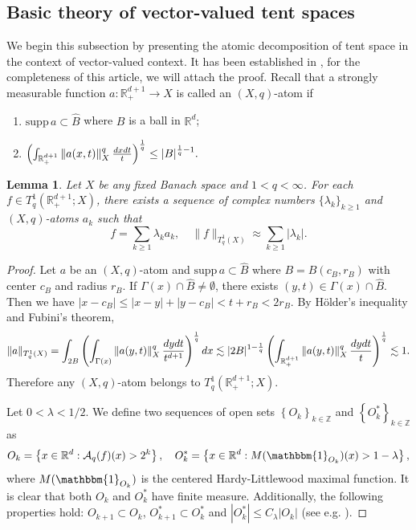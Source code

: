\documentclass[oneside,english,a4wide]{amsart}
\numberwithin{equation}{section}
\numberwithin{figure}{section}
\theoremstyle{plain}
\theoremstyle{plain}
\theoremstyle{definition}
\theoremstyle{plain}
\newtheorem{lemma}[thm]{Lemma}
\theoremstyle{remark}
\theoremstyle{definition}
\theoremstyle{remark}
\theoremstyle{definition}
\newcommand{\real}{{\mathbb R}}
\newcommand{\ent}{{\mathbb Z}}
\newcommand{\A}{{\mathcal A}}
\newcommand{\8}{+\infty}
\renewcommand{\1}{\mathbbm{1}}
\newcommand{\wh}{\widehat}
\newcommand\sk[1]{ \left( #1 \right) }
\newcommand\lk[1]{ \left\{ #1 \right\} }
\newcommand\supp{\text{supp}}
\renewcommand\d{{\rm d}}
\begin{document}
{\subsection{Basic theory of vector-valued tent spaces}
We begin this subsection by presenting  the atomic decomposition of tent space in the context of vector-valued context. It has been established in \cite[Theorem 4.5]{Kemppainen2014}, for the completeness of this article, we will attach the proof. Recall that a strongly measurable function $a : \real^{d+1}_+ \to X$ is called an $(X, q)$-atom if
\begin{enumerate}
    \item $\supp\, a \subset \wh{B}$ where $B$ is a ball in $\real^d$;
    \item $ \sk{ \int_{\real^{d+1}_+} \|a(x, t)\|_X^q \, \frac{\d x \d t}{t} }^{\frac{1}{q}} \leq |B|^{\frac1q - 1}. $
\end{enumerate}

\begin{lemma}\label{atmicDectent}
Let $X$ be any fixed Banach space and $1<q<\infty$.    For each $f \in T_q^1(\real^{d+1}_+; X)$, there exists a sequence of complex numbers $\{\lambda_k \}_{k \geq 1}$ and $(X, q)$-atoms $a_k$ such that
    \[
        f = \sum_{k \geq 1}\lambda_k a_k, \quad \| f \|_{T_q^1(X)} \approx \sum_{k \geq 1}|\lambda_k|.
    \]
\end{lemma}

\begin{proof}
Let $a$ be an $(X, q)$-atom and $\supp\, a \subset \wh{B}$ where $B = B(c_B, r_B)$ with center $c_B$ and radius $r_B$. If $\Gamma(x) \cap \wh{B} \neq \emptyset$, there exists $(y, t) \in \Gamma(x) \cap \wh{B}$. Then we have $|x - c_B| \leq |x - y| + |y - c_B| < t + r_B < 2r_B$. By H\"{o}lder's inequality and Fubini's theorem,
\[
    \| a \|_{T^1_q(X)} =\int_{2B}\sk{\int_{\Gamma(x)} \| a(y, t) \|_X^q \,\frac{\d y\d t}{t^{d+1}}}^{\frac{1}{q}}\d x \lesssim |2B|^{1-\frac{1}{q}}\sk{\int_{\real^{d+1}_+}\| a(y, t) \|_X^q \,\frac{\d y\d t}{t}}^{\frac{1}{q}} \lesssim 1.
\]
Therefore any $(X, q)$-atom belongs to $T^1_q(\real^{d+1}_+;X)$. 

Let $0 < \lambda < 1/2$. We define two sequences of open sets $\lk{O_k}_{k \in \ent}$ and $\lk{O_k^*}_{k \in \ent}$ as
\[
    O_k= \lk{ x \in \real^d: \A_q(f)(x) > 2^k },\quad O_k^*=\lk{ x\in \real^d: M(\1_{O_k})(x) > 1-\lambda },
\]
where $M(\1_{O_k})$ is the centered Hardy-Littlewood maximal function. It is clear that both $O_k$ and $O^*_k$ have finite measure. Additionally, the following properties hold: $O_{k+1} \subset O_k$, $O^*_{k+1} \subset O^*_k$ and $|O^*_k| \leq C_\lambda|O_k|$ (see e.g. \cite{Coifman1985}).
    

\end{proof}}
\end{document}
